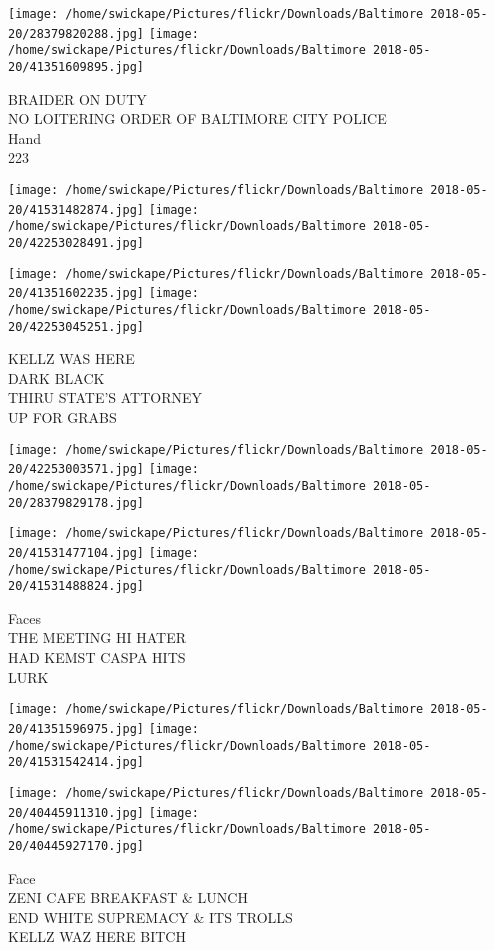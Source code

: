 \documentclass[10pt,letterpaper]{article}
\begin{document}
\texttt{[image: /home/swickape/Pictures/flickr/Downloads/Baltimore 2018-05-20/28379820288.jpg]}
\texttt{[image: /home/swickape/Pictures/flickr/Downloads/Baltimore 2018-05-20/41351609895.jpg]}

BRAIDER ON DUTY\\
NO LOITERING ORDER OF BALTIMORE CITY POLICE\\
Hand\\
223
\pagebreak

\texttt{[image: /home/swickape/Pictures/flickr/Downloads/Baltimore 2018-05-20/41531482874.jpg]}
\texttt{[image: /home/swickape/Pictures/flickr/Downloads/Baltimore 2018-05-20/42253028491.jpg]}

\texttt{[image: /home/swickape/Pictures/flickr/Downloads/Baltimore 2018-05-20/41351602235.jpg]}
\texttt{[image: /home/swickape/Pictures/flickr/Downloads/Baltimore 2018-05-20/42253045251.jpg]}

KELLZ WAS HERE\\
DARK BLACK\\
THIRU STATE'S ATTORNEY\\
UP FOR GRABS
\pagebreak

\texttt{[image: /home/swickape/Pictures/flickr/Downloads/Baltimore 2018-05-20/42253003571.jpg]}
\texttt{[image: /home/swickape/Pictures/flickr/Downloads/Baltimore 2018-05-20/28379829178.jpg]}

\texttt{[image: /home/swickape/Pictures/flickr/Downloads/Baltimore 2018-05-20/41531477104.jpg]}
\texttt{[image: /home/swickape/Pictures/flickr/Downloads/Baltimore 2018-05-20/41531488824.jpg]}

Faces\\
THE MEETING HI HATER\\
HAD KEMST CASPA HITS\\
LURK
\pagebreak

\texttt{[image: /home/swickape/Pictures/flickr/Downloads/Baltimore 2018-05-20/41351596975.jpg]}
\texttt{[image: /home/swickape/Pictures/flickr/Downloads/Baltimore 2018-05-20/41531542414.jpg]}

\texttt{[image: /home/swickape/Pictures/flickr/Downloads/Baltimore 2018-05-20/40445911310.jpg]}
\texttt{[image: /home/swickape/Pictures/flickr/Downloads/Baltimore 2018-05-20/40445927170.jpg]}

Face\\
ZENI CAFE BREAKFAST \& LUNCH\\
END WHITE SUPREMACY \& ITS TROLLS\\
KELLZ WAZ HERE BITCH
\pagebreak
\end{document}
